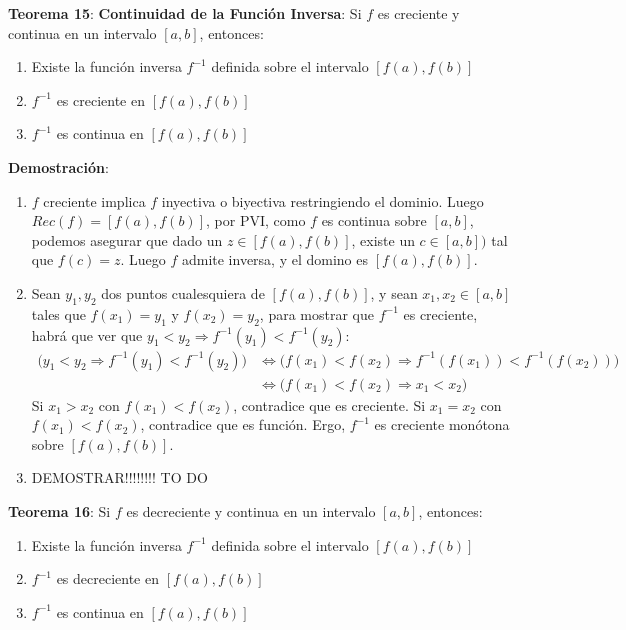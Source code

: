 \documentclass[11pt,a4paper]{article}
\begin{document}
\noindent \textbf{Teorema 15}: \textbf{Continuidad de la Funci\'on Inversa}: Si $f$ es creciente y continua en un intervalo $[a,b]$, entonces:
\begin{enumerate}
\item Existe la funci\'on inversa $f^{-1}$ definida sobre el intervalo $[f(a),f(b)]$
\item $f^{-1}$ es creciente en $[f(a),f(b)]$
\item $f^{-1}$ es continua en $[f(a),f(b)]$
\end{enumerate}
\textbf{Demostraci\'on}: 
\begin{enumerate}
\item $f$ creciente implica $f$ inyectiva o biyectiva restringiendo el dominio. Luego $Rec(f)=[f(a),f(b)]$, por PVI, como $f$ es continua sobre $[a,b]$, podemos asegurar que dado un $z\in[f(a),f(b)]$, existe un $c\in[a,b])$ tal que $f(c) = z$. Luego $f$ admite inversa, y el domino es $[f(a),f(b)]$.
\item Sean $y_1, y_2$ dos puntos cualesquiera de $[f(a),f(b)]$, y sean $x_1, x_2 \in [a,b]$ tales que $f(x_1)=y_1$ y $f(x_2)=y_2$, para mostrar que $f^{-1}$ es creciente, habr\'a que ver que $y_1<y_2 \Rightarrow f^{-1}(y_1) < f^{-1}(y_2)$:
\begin{align*}
\bigg( y_1<y_2 \Rightarrow f^{-1}(y_1) < f^{-1}(y_2) \bigg) & \iff \bigg( f(x_1)<f(x_2) \Rightarrow f^{-1}(f(x_1)) < f^{-1}(f(x_2)) \bigg)\\
& \iff \bigg( f(x_1)<f(x_2) \Rightarrow x_1 <x_2 \bigg)
\end{align*}
Si $x_1 > x_2$ con $f(x_1)<f(x_2)$, contradice que es creciente. Si $x_1 = x_2$ con $f(x_1)<f(x_2)$, contradice que es funci\'on. Ergo, $f^{-1}$ es creciente mon\'otona sobre $[f(a),f(b)]$.
\item DEMOSTRAR!!!!!!!! TO DO
\end{enumerate}

\noindent \textbf{Teorema 16}: Si $f$ es decreciente y continua en un intervalo $[a,b]$, entonces:
\begin{enumerate}
\item Existe la funci\'on inversa $f^{-1}$ definida sobre el intervalo $[f(a),f(b)]$
\item $f^{-1}$ es decreciente en $[f(a),f(b)]$
\item $f^{-1}$ es continua en $[f(a),f(b)]$
\end{enumerate}
\end{document}
